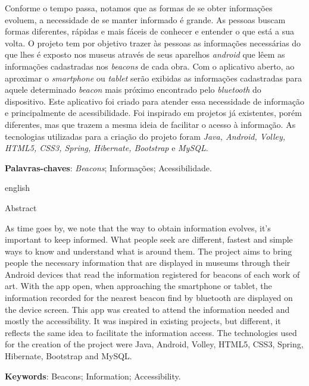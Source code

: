 \begin{resumo}
\vspace{8mm}
    Conforme o tempo passa, notamos que as formas de se obter informações evoluem, a necessidade de se manter informado é grande. As pessoas buscam formas diferentes, rápidas e mais fáceis de conhecer e entender o que está a sua volta. O projeto tem por objetivo trazer às pessoas as informações necessárias do que lhes é exposto nos museus através de seus aparelhos \textit{android} que lêem as informações cadastradas nos \textit{beacons} de cada obra. Com o aplicativo aberto, ao aproximar o \textit{smartphone} ou \textit{tablet} serão exibidas as informações cadastradas para aquele determinado \textit{beacon} mais próximo encontrado pelo \textit{bluetooth} do dispositivo. Este aplicativo foi criado para atender essa necessidade de informação e principalmente de acessibilidade. Foi inspirado em projetos já existentes, porém diferentes, mas que trazem a mesma ideia de facilitar o acesso à informação. As tecnologias utilizadas para a criação do projeto foram \textit{Java, Android, Volley, HTML5, CSS3, Spring, Hibernate, Bootstrap} e \textit{MySQL}. 
    \vspace{\onelineskip}

    \noindent\textbf{Palavras-chaves}: \textit{Beacons}; Informações; Acessibilidade.

    \vspace{\onelineskip}
    \vspace{\onelineskip}

	\newpage

    \begin{otherlanguage*}{english}
    \begin{center}{\ABNTEXchapterfont\huge Abstract}\end{center} As time goes by, we note that the way to obtain information evolves, it’s important to keep informed. What people seek are different, fastest and simple ways to know and understand what is around them. The project aims to bring people the necessary information that are displayed in museums through their Android devices that read the information registered for beacons of each work of art. With the app open, when approaching the smartphone or tablet, the information recorded for the nearest beacon find by bluetooth are displayed on the device screen. This app was created to attend the information needed and mostly the accessibility. It was inspired in existing projects, but different, it reflects the same idea to facilitate the information access. The technologies used for the creation of the project were Java, Android, Volley, HTML5, CSS3, Spring, Hibernate, Bootstrap and MySQL.
    
    \vspace{\onelineskip}

    \noindent\textbf{Keywords}: Beacons; Information; Accessibility.

    \end{otherlanguage*}
\end{resumo}


